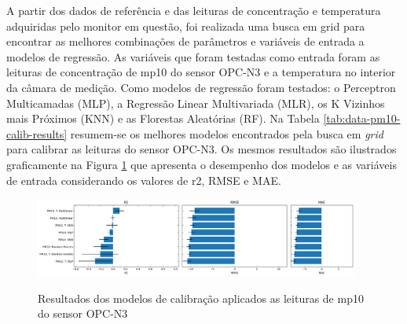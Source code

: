 A partir dos dados de referência e das leituras de concentração e temperatura adquiridas pelo monitor em questão, foi realizada uma busca em grid para encontrar as melhores combinações de parâmetros e variáveis de entrada a modelos de regressão. As variáveis que foram testadas como entrada foram as leituras de concentração de \acrshort{mp10} do sensor OPC-N3 e a temperatura no interior da câmara de medição. Como modelos de regressão foram testados: o Perceptron Multicamadas (MLP), a Regressão Linear Multivariada (MLR), os K Vizinhos mais Próximos (KNN) e as Florestas Aleatórias (RF). Na Tabela \ref{tab:data-pm10-calib-results} resumem-se os melhores modelos encontrados pela busca em \textit{grid} para calibrar as leituras do sensor OPC-N3. Os mesmos resultados são ilustrados graficamente na Figura \ref{fig:data-pm10-models-performance} que apresenta o desempenho dos modelos e as variáveis de entrada considerando os valores de r2, RMSE e MAE.

\begin{figure}[h!]
    \centering
    \caption{Resultados dos modelos de calibração aplicados as leituras de \acrshort{mp10} do sensor OPC-N3}
    \includegraphics[width=0.95\textwidth]{chapters/4-CALIBRAÇÃO MÚLTIPLOS SENSORES/Figuras/pm10-models-performance.png}
    \label{fig:data-pm10-models-performance}
\end{figure}

